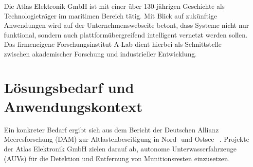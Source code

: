 Die Atlas Elektronik GmbH ist mit einer über 130-jährigen Geschichte als Technologieträger im maritimen Bereich tätig. Mit Blick auf zukünftige Anwendungen wird auf der Unternehmenswebseite betont, dass Systeme nicht nur funktional, sondern auch plattformübergreifend intelligent vernetzt werden sollen. Das firmeneigene Forschungsinstitut A-Lab dient hierbei als Schnittstelle zwischen akademischer Forschung und industrieller Entwicklung.

\section{Lösungsbedarf und Anwendungskontext}

Ein konkreter Bedarf ergibt sich aus dem Bericht der Deutschen Allianz Meeresforschung (DAM) zur Altlastenbeseitigung in Nord- und Ostsee ~\parencite{dam2024}. Projekte der Atlas Elektronik GmbH zielen darauf ab, autonome Unterwasserfahrzeuge (AUVs) für die Detektion und Entfernung von Munitionsresten einzusetzen. 








